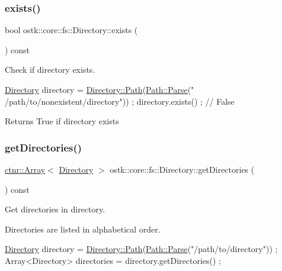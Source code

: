 \subsubsection{\texorpdfstring{exists()}{exists()}}
{\footnotesize\ttfamily bool ostk\+::core\+::fs\+::\+Directory\+::exists (\begin{DoxyParamCaption}{ }\end{DoxyParamCaption}) const}



Check if directory exists. 


\begin{DoxyCode}
\hyperlink{classostk_1_1core_1_1fs_1_1_directory_adc893e10f55282be0d0455e9cfc5796b}{Directory} directory = \hyperlink{classostk_1_1core_1_1fs_1_1_directory_a0151dba2940d5f426b52209dc7dab2e5}{Directory::Path}(\hyperlink{classostk_1_1core_1_1fs_1_1_path_ad08539ba654f5df11c4bcb07276345ad}{Path::Parse}(\textcolor{stringliteral}{"
      /path/to/nonexistent/directory"})) ;
directory.exists() ; \textcolor{comment}{// False}
\end{DoxyCode}


\begin{DoxyReturn}{Returns}
True if directory exists 
\end{DoxyReturn}
\mbox{\label{classostk_1_1core_1_1fs_1_1_directory_a18ba6edc464768c26d2cbd821fa8b172}} 
\subsubsection{\texorpdfstring{get\+Directories()}{getDirectories()}}
{\footnotesize\ttfamily \hyperlink{classostk_1_1core_1_1ctnr_1_1_array}{ctnr\+::\+Array}$<$ \hyperlink{classostk_1_1core_1_1fs_1_1_directory}{Directory} $>$ ostk\+::core\+::fs\+::\+Directory\+::get\+Directories (\begin{DoxyParamCaption}{ }\end{DoxyParamCaption}) const}



Get directories in directory. 

Directories are listed in alphabetical order.


\begin{DoxyCode}
\hyperlink{classostk_1_1core_1_1fs_1_1_directory_adc893e10f55282be0d0455e9cfc5796b}{Directory} directory = \hyperlink{classostk_1_1core_1_1fs_1_1_directory_a0151dba2940d5f426b52209dc7dab2e5}{Directory::Path}(\hyperlink{classostk_1_1core_1_1fs_1_1_path_ad08539ba654f5df11c4bcb07276345ad}{Path::Parse}(\textcolor{stringliteral}{"/path/to/directory"}))
       ;
Array<Directory> directories = directory.getDirectories() ;
\end{DoxyCode}


